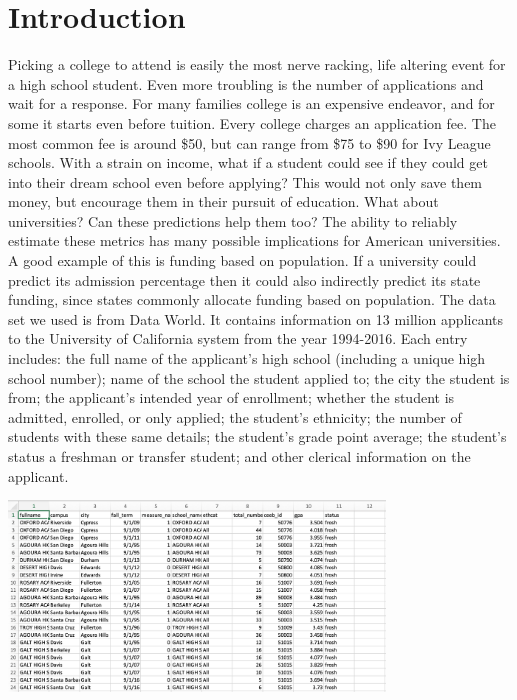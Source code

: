 \documentclass{article}
\begin{document}
\section{Introduction}
Picking a college to attend is easily the most nerve racking, life altering event for a high school student. Even more troubling is the number of applications and wait for a response. For many families college is an expensive endeavor, and for some it starts even before tuition. Every college charges an application fee. The most common fee is around \$50, but can range from \$75 to \$90 for Ivy League schools.\citep{Berger} With a strain on income, what if a student could see if they could get into their dream school even before applying? This would not only save them money, but encourage them in their pursuit of education.\newline \indent
What about universities? Can these predictions help them too? The ability to reliably estimate these metrics has many possible implications for American universities. A good example of this is funding based on population. If a university could predict its admission percentage then it could also indirectly predict its state funding, since states commonly allocate funding based on population.\citep{Miao} \newline \indent
The data set we used is from Data World. It contains information on 13 million applicants to the University of California system from the year 1994-2016. Each entry includes: the full name of the applicant's high school (including a unique high school number); name of the school the student applied to; the city the student is from; the applicant's intended year of enrollment; whether the student is admitted, enrolled, or only applied; the student's ethnicity; the number of students with these same details; the student's grade point average; the student's status a freshman or transfer student; and other clerical information on the applicant.\newline

\begin{center}
    \includegraphics[width=100mm, scale=0.5]{images/ColumnHeader.png}
\end{center}
\end{document}
